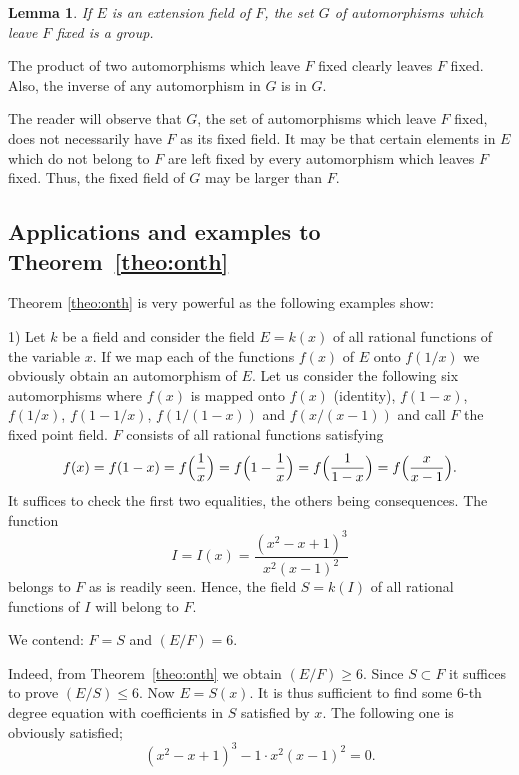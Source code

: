 \documentclass[10pt,leqno]{article}
\newtheorem*{lemm*}{Lemma}
\theoremstyle{definition}
\begin{document}
\begin{lemm*}
If $E$ is an extension field of $F$, the set $G$ of automorphisms which leave $F$ fixed is a group.
\end{lemm*}


The product of two automorphisms which leave $F$ fixed clearly leaves $F$ fixed.
Also, the inverse of any automorphism in $G$ is in $G$.

The reader will observe that $G$, the set of automorphisms which leave $F$ fixed, does not necessarily have $F$ as its fixed field.
It may be that certain elements in $E$ which do not belong to $F$ are left fixed by every automorphism which leaves $F$ fixed.
Thus, the fixed field of $G$ may be larger than $F$.


\subsection[Applications and examples]{Applications and examples to Theorem~\ref{theo:onth}}


Theorem \ref{theo:onth} is very powerful as the following examples show:


1)
Let $k$ be a field and consider the field $E = k(x)$ of all rational functions of the variable $x$.
If we map each of the functions $f(x)$ of $E$ onto $f(1/x)$ we obviously obtain an automorphism of $E$.
Let us consider the following six automorphisms where $f(x)$ is mapped onto $f(x)$ (identity), $f(1-x)$, $f(1/x)$, $f(1-1/x)$, $f(1/(1-x))$ and $f(x/(x-1))$ and call $F$ the fixed point field.
$F$ consists of all rational functions satisfying
\begin{equation}
\label{eq:twGon}
f(x)
= f(1-x)
= f\Bigl(\frac 1x\Bigr)
= f\Bigl(1 - \frac 1x\Bigr)
= f\Bigl(\frac 1{1-x}\Bigr)
= f\Bigl(\frac{x}{x-1}\Bigr).
\end{equation}
It suffices to check the first two equalities, the others being consequences.
The function
\begin{equation}
\label{eq:twGtw}
I = I(x) = \frac{(x^2 - x + 1)^3}{x^2(x-1)^2}
\end{equation}
belongs to $F$ as is readily seen.
Hence, the field $S = k(I)$ of all rational functions of $I$ will belong to $F$.

We contend: $F = S$ and $(E/F) = 6$.

Indeed, from Theorem~\ref{theo:onth} we obtain $(E/F) \geq 6$.
Since $S \subset F$ it suffices to prove $(E/S) \leq 6$.
Now $E = S(x)$.
It is thus sufficient to find some 6-th degree equation with coefficients in $S$ satisfied by $x$.
The following one is obviously satisfied;
\[
        (x^2 - x + 1)^3 - 1 \cdot x^2(x-1)^2 = 0.
\]
\end{document}
